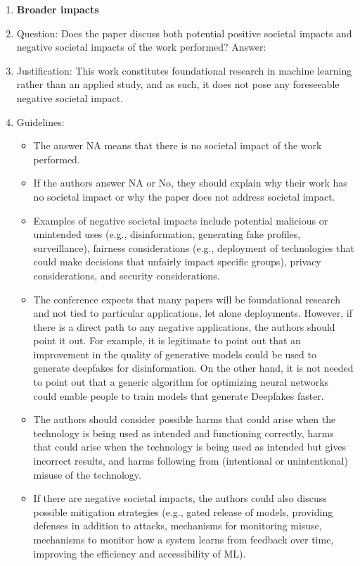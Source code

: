 \documentclass{article}
\begin{document}
\begin{enumerate}
\item {\bf Broader impacts}
    \item[] Question: Does the paper discuss both potential positive societal impacts and negative societal impacts of the work performed?
    Answer: \answerNo{} %
    \item[] Justification: This work constitutes foundational research in machine learning rather than an applied study, and as such, it does not pose any foreseeable negative societal impact.
    \item[] Guidelines:
    \begin{itemize}
        \item The answer NA means that there is no societal impact of the work performed.
        \item If the authors answer NA or No, they should explain why their work has no societal impact or why the paper does not address societal impact.
        \item Examples of negative societal impacts include potential malicious or unintended uses (e.g., disinformation, generating fake profiles, surveillance), fairness considerations (e.g., deployment of technologies that could make decisions that unfairly impact specific groups), privacy considerations, and security considerations.
        \item The conference expects that many papers will be foundational research and not tied to particular applications, let alone deployments. However, if there is a direct path to any negative applications, the authors should point it out. For example, it is legitimate to point out that an improvement in the quality of generative models could be used to generate deepfakes for disinformation. On the other hand, it is not needed to point out that a generic algorithm for optimizing neural networks could enable people to train models that generate Deepfakes faster.
        \item The authors should consider possible harms that could arise when the technology is being used as intended and functioning correctly, harms that could arise when the technology is being used as intended but gives incorrect results, and harms following from (intentional or unintentional) misuse of the technology.
        \item If there are negative societal impacts, the authors could also discuss possible mitigation strategies (e.g., gated release of models, providing defenses in addition to attacks, mechanisms for monitoring misuse, mechanisms to monitor how a system learns from feedback over time, improving the efficiency and accessibility of ML).
    \end{itemize}
    

\end{enumerate}
\end{document}
